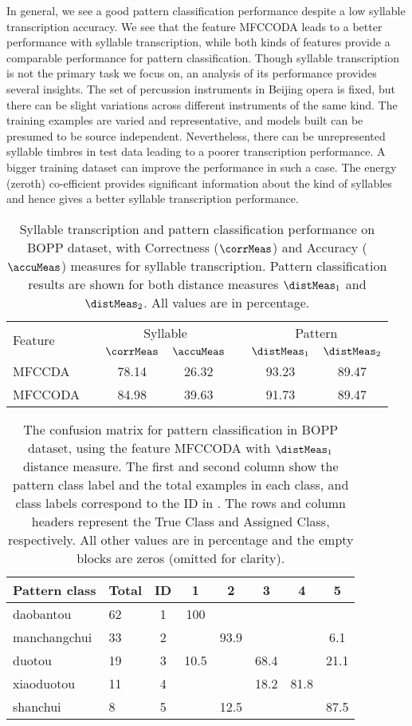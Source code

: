 In general, we see a good pattern classification performance despite a low syllable transcription accuracy. We see that the feature \acrshort{MFCCODA} leads to a better performance with syllable transcription, while both kinds of features provide a comparable performance for pattern classification. Though syllable transcription is not the primary task we focus on, an analysis of its performance provides several insights. The set of percussion instruments in Beijing opera is fixed, but there can be slight variations across different instruments of the same kind. The training examples are varied and representative, and models built can be presumed to be source independent. Nevertheless, there can be unrepresented syllable timbres in test data leading to a poorer transcription performance. A bigger training dataset can improve the performance in such a case. The energy (zeroth) co-efficient provides significant information about the kind of syllables and hence gives a better syllable transcription performance. 
\begin{table}
\centering
\begin{tabular}{@{}lcccccc@{}} \toprule
\multirow{2}{*}{Feature} & & \multicolumn{2}{c}{Syllable} & & \multicolumn{2}{c}{Pattern}\tabularnewline 
 & & $\corrMeas$ & $\accuMeas$ & & $\distMeas_1$ & $\distMeas_2$\tabularnewline \midrule
\acrshort{MFCCDA} & & 78.14 & 26.32 & & 93.23 & 89.47\tabularnewline 
\acrshort{MFCCODA} & & 84.98 & 39.63 & & 91.73 & 89.47\tabularnewline \bottomrule
\end{tabular}
\caption[Transcription and classification results on \acrshort{BOPP} dataset]{Syllable transcription and pattern classification performance on \acrshort{BOPP} dataset, with Correctness ($\corrMeas$) and Accuracy ($\accuMeas$) measures for syllable transcription. Pattern classification results are shown for both distance measures $\distMeas_1$ and $\distMeas_2$. All values are in percentage.} \label{tab:ppres:bopp}
\end{table}
%
\begin{table}
\centering
\begin{tabular}{@{}ll|cccccc@{}}\toprule
Pattern class & Total & ID & 1 & 2 & 3 & 4 & 5 \tabularnewline \midrule
\gls{daobantou} & 62 & 1 & 100 &  &  &  &  \tabularnewline 
\gls{manchangchui} & 33 & 2 & & 93.9 &  &  & 6.1 \tabularnewline 
\gls{duotou} & 19 & 3 &10.5 &  & 68.4 &  & 21.1 \tabularnewline 
\gls{xiaoduotou} & 11 & 4 & &  &  18.2 & 81.8 & \tabularnewline 
\gls{shanchui} & 8 & 5 & & 12.5 &  &  & 87.5 \tabularnewline \bottomrule
\end{tabular}
\caption[Confusion matrix for percussion pattern classification in \acrshort{BOPP} dataset]{The confusion matrix for pattern classification in \acrshort{BOPP} dataset, using the feature \acrshort{MFCCODA} with $\distMeas_1$ distance measure. The first and second column show the pattern class label and the total examples in each class, and class labels correspond to the ID in . The rows and column headers represent the True Class and Assigned Class, respectively. All other values are in percentage and the empty blocks are zeros (omitted for clarity).} \label{tab:ppres:boppconf}
\end{table}

